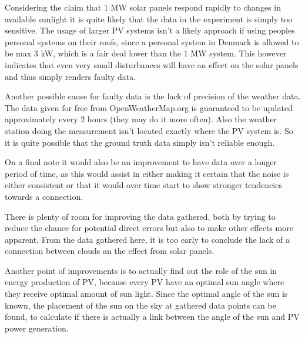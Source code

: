 Considering the claim that 1 MW solar panels respond rapidly to
changes in available sunlight \citep{cloudTrack} it is quite likely
that the data in the experiment is simply too sensitive.
The usage of larger PV systems isn't a likely approach if using
peoples personal systems on their roofs, since a personal system in
Denmark is allowed to be max 3 kW, which is a fair deal lower than the
1 MW system.  This however indicates that even very small disturbances
will have an effect on the solar panels and thus simply renders faulty
data.

Another possible cause for faulty data is the lack of precision of the
weather data.  The data given for free from OpenWeatherMap.org is
guaranteed to be updated approximately every 2 hours (they may do it
more often).  Also the weather station doing the measurement isn't
located exactly where the PV system is.  So it is quite possible that
the ground truth data simply isn't reliable enough.

On a final note it would also be an improvement to have data over a
longer period of time, as this would assist in either making it
certain that the noise is either consistent or that it would over time
start to show stronger tendencies towards a connection.

There is plenty of room for improving the data gathered, both by
trying to reduce the chance for potential direct errors but also to
make other effects more apparent.  From the data gathered here, it is too
early to conclude the lack of a connection between clouds an the
effect from solar panels.

Another point of improvements is to actually find out the role of the sun in energy production of PV, because every PV have an optimal sun angle where they receive optimal amount of sun light.  Since the optimal angle of the sun is known, the placement of the sun on the sky at gathered data points can be found, to calculate if there is actually a link between the angle of the sun and PV power generation.

